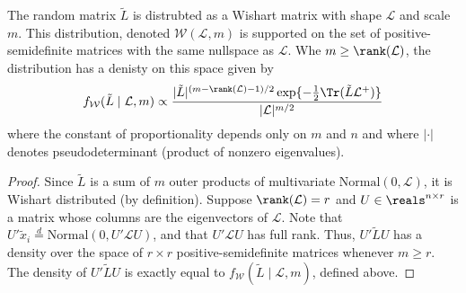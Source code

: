 \begin{lemma}\label{L:approx-wishart}
  The random matrix $\tilde L$ is distrubted as a Wishart matrix with
  shape $\mathcal{L}$ and scale $m$.  This distribution, denoted
  $\mathcal{W}(\mathcal{L}, m)$ is supported on the set of
  positive-semidefinite matrices with the same nullspace as $\mathcal{L}$.  Whe
  $m \geq \rank(\mathcal{L})$, the distribution has a denisty on this space
  given by
  \begin{equation}\label{E:wishart-density}
   f_\mathcal{W}( \tilde L \mid \mathcal{L}, m)
      \propto
      \frac{|\tilde L|^{(m - \rank(\mathcal{L}) - 1)/2}
        \exp\{-\tfrac{1}{2} \Tr(\tilde L \mathcal{L}^+) \}}
        {|\mathcal{L}|^{m/2}}
  \end{equation}
  where the constant of proportionality depends only on $m$ and $n$
  and where $|\cdot|$ denotes pseudodeterminant (product of nonzero
  eigenvalues).
\end{lemma}
\begin{proof}
  Since $\tilde L$ is a sum of $m$ outer products of multivariate
  $\mathrm{Normal}(0, \mathcal{L})$, it is Wishart distributed
  (by definition).
  Suppose $\rank(\mathcal{L}) = r$ and
  $U \in \reals^{n \times r}$ is a matrix whose columns are the
    eigenvectors of $\mathcal{L}$.  Note that
    $U' \tilde x_i \overset{d}{=} \mathrm{Normal}(0, U' \mathcal{L} U)$,
    and that $U' \mathcal{L} U$ has full rank.  Thus,
    \(
      U' \tilde L U
    \)
    has a density over the space of $r \times r$ positive-semidefinite
    matrices whenever $m \geq r$.  The density of $U' \tilde L U$ is
    exactly equal to $f_\mathcal{W}(\tilde L \mid \mathcal{L}, m)$,
    defined above.
\end{proof}


